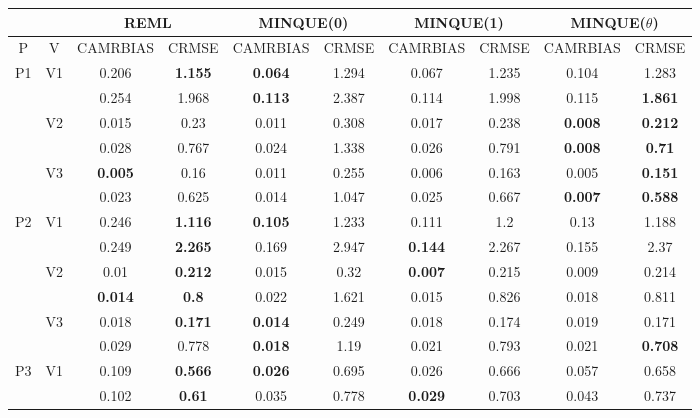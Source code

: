 \documentclass[12pt,a4paper]{article}
\begin{document}
\begin{sidewaystable}[ht]
\centering
{\footnotesize
\begin{tabular}{cc|cc|cc|cc|cc|}
   & & \multicolumn{2}{c|}{REML}&\multicolumn{2}{c|}{MINQUE(0)}&\multicolumn{2}{c|}{MINQUE(1)}&\multicolumn{2}{c|}{MINQUE($\theta$)}\\ \hline
P & V & CAMRBIAS & CRMSE & CAMRBIAS & CRMSE & CAMRBIAS & CRMSE & CAMRBIAS & CRMSE \\ 
  \hline
\multirow{6}{*}{P1} & \multirow{2}{*}{V1} & 0.206 & \textbf{1.155} & \textbf{0.064} & 1.294 & 0.067 & 1.235 & 0.104 & 1.283 \\ 
   &  & 0.254 & 1.968 & \textbf{0.113} & 2.387 & 0.114 & 1.998 & 0.115 & \textbf{1.861} \\ 
   & \multirow{2}{*}{V2} & 0.015 & 0.23 & 0.011 & 0.308 & 0.017 & 0.238 & \textbf{0.008} & \textbf{0.212} \\ 
   &  & 0.028 & 0.767 & 0.024 & 1.338 & 0.026 & 0.791 & \textbf{0.008} & \textbf{0.71} \\ 
   & \multirow{2}{*}{V3} & \textbf{0.005} & 0.16 & 0.011 & 0.255 & 0.006 & 0.163 & 0.005 & \textbf{0.151} \\ 
   &  & 0.023 & 0.625 & 0.014 & 1.047 & 0.025 & 0.667 & \textbf{0.007} & \textbf{0.588} \\ 
   \hline \hline\multirow{6}{*}{P2} & \multirow{2}{*}{V1} & 0.246 & \textbf{1.116} & \textbf{0.105} & 1.233 & 0.111 & 1.2 & 0.13 & 1.188 \\ 
   &  & 0.249 & \textbf{2.265} & 0.169 & 2.947 & \textbf{0.144} & 2.267 & 0.155 & 2.37 \\ 
   & \multirow{2}{*}{V2} & 0.01 & \textbf{0.212} & 0.015 & 0.32 & \textbf{0.007} & 0.215 & 0.009 & 0.214 \\ 
   &  & \textbf{0.014} & \textbf{0.8} & 0.022 & 1.621 & 0.015 & 0.826 & 0.018 & 0.811 \\ 
   & \multirow{2}{*}{V3} & 0.018 & \textbf{0.171} & \textbf{0.014} & 0.249 & 0.018 & 0.174 & 0.019 & 0.171 \\ 
   &  & 0.029 & 0.778 & \textbf{0.018} & 1.19 & 0.021 & 0.793 & 0.021 & \textbf{0.708} \\ 
   \hline \hline\multirow{6}{*}{P3} & \multirow{2}{*}{V1} & 0.109 & \textbf{0.566} & \textbf{0.026} & 0.695 & 0.026 & 0.666 & 0.057 & 0.658 \\ 
   &  & 0.102 & \textbf{0.61} & 0.035 & 0.778 & \textbf{0.029} & 0.703 & 0.043 & 0.737 \\ 

\end{tabular}}
\end{sidewaystable}
\end{document}

